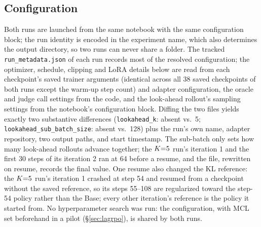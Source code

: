 \subsection{Configuration}

Both runs are launched from the same notebook with the same configuration block; the run identity
is encoded in the experiment name, which also determines the output directory, so two runs can
never share a folder. The tracked \texttt{run\_metadata.json} of each run records most of the resolved
configuration; the optimizer, schedule, clipping and LoRA details below are read from each
checkpoint's saved trainer arguments (identical across all 38 saved checkpoints of both runs except
the warm-up step count) and adapter configuration, the oracle and judge call settings from the
code, and the look-ahead rollout's sampling settings from the notebook's configuration block. Diffing the two files yields exactly two substantive differences
(\texttt{lookahead\_k}: absent vs.\ 5; \texttt{lookahead\_sub\_batch\_size}: absent vs.\ 128) plus
the run's own name, adapter repository, two output paths, and start timestamp. The sub-batch only
sets how many look-ahead rollouts advance together; the $K{=}5$ run's iteration 1 and the first 30
steps of its iteration 2 ran at 64 before a resume, and the file, rewritten on resume, records the
final value. One resume also changed the KL reference: the $K{=}5$ run's iteration 1 crashed at step
54 and resumed from a checkpoint without the saved reference, so its steps 55--108 are regularized
toward the step-54 policy rather than the Base; every other iteration's reference is the policy it
started from. No hyperparameter search was run: the configuration, with MCL set beforehand in a
pilot (\S\ref{sec:lagrpo}), is shared by both runs.

